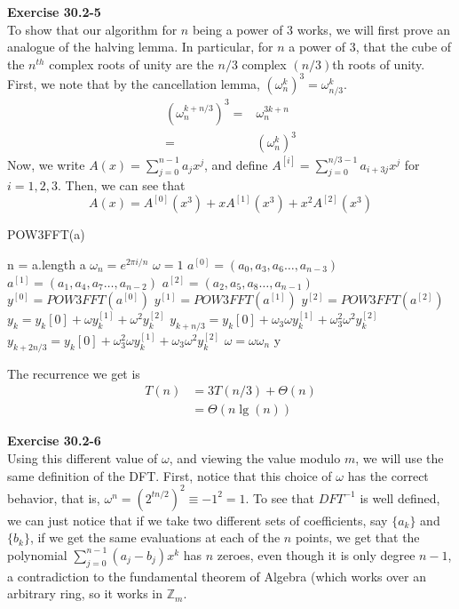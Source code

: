 \documentclass{article}
\begin{document}
\noindent\textbf{Exercise 30.2-5}\\

To show that our algorithm for $n$ being a power of $3$ works, we will first prove an analogue of the halving lemma. In particular, for $n$ a power of 3, that the cube of the $n^{th}$ complex roots of unity are the $n/3$ complex $(n/3)$th roots of unity. First, we note that by the cancellation lemma, $(\omega_{n}^k)^3 = \omega_{n/3}^k$. 
\begin{align*}
(\omega_n^{k+n/3})^3 =& \omega_n^{3k+n}\\
=&(\omega_n^k)^3
\end{align*}
Now, we write $A(x) = \sum_{j=0}^{n-1} a_jx^j$, and define $A^{[i]} = \sum_{j=0}^{n/3-1}a_{i+3j}x^j$ for $i=1,2,3$. Then, we can see that \[A(x) = A^{[0]}(x^3) + x A^{[1]}(x^3) + x^2 A^{[2]}(x^3)\]

\begin{algorithm}
\caption{POW3FFT(a)}
\begin{algorithmic}
\State n = a.length
\State \Return a
\EndIf
\State $\omega_n = e^{2\pi i/n}$
\State $\omega =1$
\State $a^{[0]} = (a_0,a_3,a_6\ldots, a_{n-3})$
\State $a^{[1]} = (a_1,a_4,a_7\ldots, a_{n-2})$
\State $a^{[2]} = (a_2,a_5,a_8\ldots, a_{n-1})$
\State $y^{[0]} = POW3FFT(a^{[0]})$
\State $y^{[1]} = POW3FFT(a^{[1]})$
\State $y^{[2]} = POW3FFT(a^{[2]})$
\State $y_k = y_k[0] +\omega y_k^{[1]} + \omega^2 y_{k}^{[2]}$
\State $y_{k+n/3} = y_k[0] +\omega_3\omega y_k^{[1]} + \omega_3^2\omega^2 y_{k}^{[2]}$
\State $y_{k+2n/3} = y_k[0] +\omega_3^2\omega y_k^{[1]} + \omega_3\omega^2 y_{k}^{[2]}$
\State $\omega = \omega \omega_n$
\EndFor
\State\Return y
\end{algorithmic}
\end{algorithm}

The recurrence we get is
\begin{align*}
T(n) &= 3 T(n/3) + \Theta(n)\\
&= \Theta(n\lg(n))
\end{align*}

\noindent\textbf{Exercise 30.2-6}\\

Using this different value of $\omega$, and viewing the value modulo $m$, we will use the same definition of the DFT. First, notice that this choice of $\omega$ has the correct behavior, that is, $\omega^{n} = (2^{tn/2})^2 \equiv -1^2 =1$. To see that $DFT^{-1}$ is well defined, we can just notice that if we take two different sets of coefficients, say $\{a_k\}$ and $\{b_k\}$, if we get the same evaluations at each of the $n$ points, we get that the polynomial $\sum_{j=0}^{n-1} (a_j - b_j) x^k$ has $n$ zeroes, even though it is only degree $n-1$, a contradiction to the fundamental theorem of Algebra (which works over an arbitrary ring, so it works in $\mathbb{Z}_m$.
\end{document}
